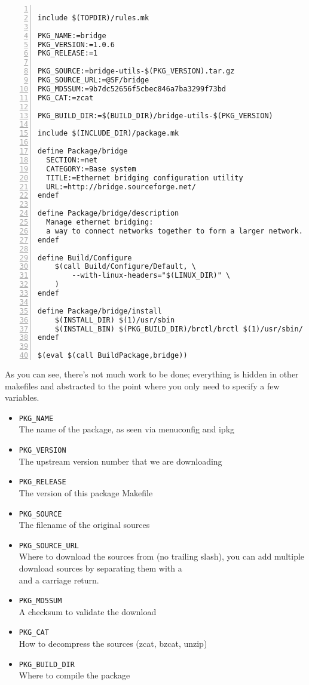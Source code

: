\begin{Verbatim}[frame=single,numbers=left]

include $(TOPDIR)/rules.mk

PKG_NAME:=bridge
PKG_VERSION:=1.0.6
PKG_RELEASE:=1

PKG_SOURCE:=bridge-utils-$(PKG_VERSION).tar.gz
PKG_SOURCE_URL:=@SF/bridge
PKG_MD5SUM:=9b7dc52656f5cbec846a7ba3299f73bd
PKG_CAT:=zcat

PKG_BUILD_DIR:=$(BUILD_DIR)/bridge-utils-$(PKG_VERSION)

include $(INCLUDE_DIR)/package.mk

define Package/bridge
  SECTION:=net
  CATEGORY:=Base system
  TITLE:=Ethernet bridging configuration utility
  URL:=http://bridge.sourceforge.net/
endef

define Package/bridge/description
  Manage ethernet bridging: 
  a way to connect networks together to form a larger network.
endef

define Build/Configure
    $(call Build/Configure/Default, \
        --with-linux-headers="$(LINUX_DIR)" \
    )
endef

define Package/bridge/install
    $(INSTALL_DIR) $(1)/usr/sbin
    $(INSTALL_BIN) $(PKG_BUILD_DIR)/brctl/brctl $(1)/usr/sbin/
endef

$(eval $(call BuildPackage,bridge))
\end{Verbatim}

As you can see, there's not much work to be done; everything is hidden in other makefiles
and abstracted to the point where you only need to specify a few variables.

\begin{itemize}
    \item \texttt{PKG\_NAME} \\
        The name of the package, as seen via menuconfig and ipkg
    \item \texttt{PKG\_VERSION} \\
        The upstream version number that we are downloading
    \item \texttt{PKG\_RELEASE} \\
        The version of this package Makefile
    \item \texttt{PKG\_SOURCE} \\
        The filename of the original sources
    \item \texttt{PKG\_SOURCE\_URL} \\
        Where to download the sources from (no trailing slash), you can add multiple download sources by separating them with a \\ and a carriage return.
    \item \texttt{PKG\_MD5SUM} \\
        A checksum to validate the download
    \item \texttt{PKG\_CAT} \\
        How to decompress the sources (zcat, bzcat, unzip)
    \item \texttt{PKG\_BUILD\_DIR} \\
        Where to compile the package
\end{itemize}

